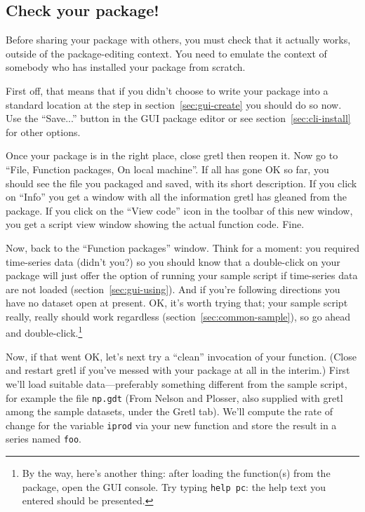 \documentclass[oneside]{book}
\begin{document}
\subsection{Check your package!}

Before sharing your package with others, you must check that it
actually works, outside of the package-editing context. You need to
emulate the context of somebody who has installed your package from
scratch.

First off, that means that if you didn't choose to write your package
into a standard location at the step in section~\ref{sec:gui-create}
you should do so now. Use the ``Save...'' button in the GUI package
editor or see section~\ref{sec:cli-install} for other options.

Once your package is in the right place, close gretl then reopen it.
Now go to ``File, Function packages, On local machine''. If all has
gone OK so far, you should see the file you packaged and saved, with
its short description.  If you click on ``Info'' you get a window with
all the information gretl has gleaned from the package.  If you click
on the ``View code'' icon in the toolbar of this new window, you get a
script view window showing the actual function code. Fine.

Now, back to the ``Function packages'' window. Think for a moment: you
required time-series data (didn't you?) so you should know that a
double-click on your package will just offer the option of running
your sample script if time-series data are not loaded
(section~\ref{sec:gui-using}). And if you're following directions you
have no dataset open at present. OK, it's worth trying that; your
sample script really, really should work regardless
(section~\ref{sec:common-sample}), so go ahead and
double-click.\footnote{By the way, here's another thing: after loading
  the function(s) from the package, open the GUI console. Try typing
  \texttt{help pc}: the help text you entered should be presented.}

Now, if that went OK, let's next try a ``clean'' invocation of your
function. (Close and restart gretl if you've messed with your package
at all in the interim.)  First we'll load suitable data---preferably
something different from the sample script, for example the file
\texttt{np.gdt} (From Nelson and Plosser, also supplied with gretl
among the sample datasets, under the \textsf{Gretl} tab). We'll
compute the rate of change for the variable \texttt{iprod} via your
new function and store the result in a series named \texttt{foo}.
\end{document}
